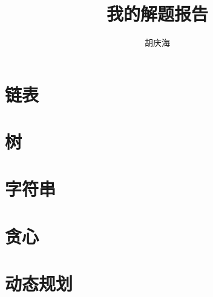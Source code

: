 \documentclass[oneside]{book}
\begin{document}
\begin{CJK}{UTF8}{gbsn}     %

\renewcommand{\contentsname}{目录}
\renewcommand{\figurename}{图}
\renewcommand{\tablename}{表}

\renewcommand{\cftchapfont}{\bfseries}
\renewcommand{\cftchappagefont}{\bfseries}
\renewcommand{\cftchappresnum}{第}
\renewcommand{\cftchapaftersnum}{章:}
\renewcommand{\cftchapnumwidth}{4em}      %

\pagestyle{fancy}
\renewcommand{\chaptermark}[1]{\markboth{\small 第\,\thechapter\,章\quad #1}{}}
\renewcommand{\sectionmark}[1]{\markright{\small\thesection\quad #1}{}}
\fancyhf{}
\fancyhead[ER]{\leftmark}
\fancyhead[OL]{\rightmark}
\fancyhead[EL,OR]{$\cdot$\ \thepage\ $\cdot$}
\renewcommand{\headrulewidth}{0.4pt}

\title{我的解题报告}
\author{胡庆海}
\date{}

\maketitle

\tableofcontents

\chapter{链表}


\chapter{树}


\chapter{字符串}


%

%

%

\chapter{贪心}


\chapter{动态规划}



\end{CJK}
\end{document}
